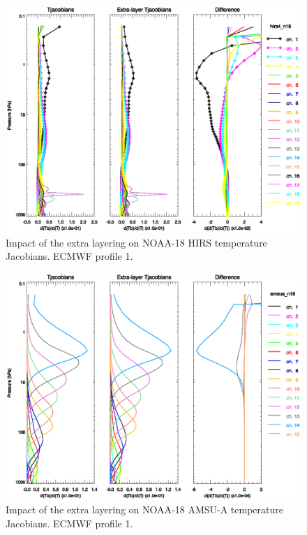 \begin{figure}[htp]
  \centering
  \includegraphics[scale=0.8]{graphics/hirs4_n18.t_k_el.p1.eps}
  \caption{Impact of the extra layering on NOAA-18 HIRS temperature Jacobians. ECMWF profile 1.}
  \label{fig:hirs4_n18.t_k_el.p1}
\end{figure}
\begin{figure}[htp]
  \centering
  \includegraphics[scale=0.8]{graphics/amsua_n18.t_k_el.p1.eps}
  \caption{Impact of the extra layering on NOAA-18 AMSU-A temperature Jacobians. ECMWF profile 1.}
  \label{fig:amsua_n18.t_k_el.p1}
\end{figure}
